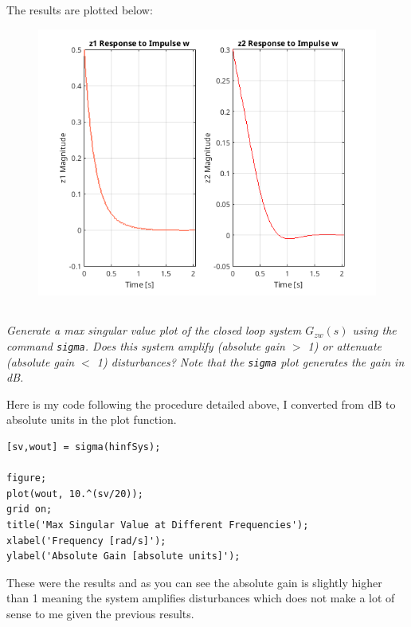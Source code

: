 \documentclass[12pt, letterpaper]{article}
\begin{document}
The results are plotted below:

\begin{figure}[H]
    \centering
    \includegraphics{zResponseHinf.png}
\end{figure}

\subsection{}
\textit{
Generate a max singular value plot of the closed loop system $G_{zw}(s)$ using the command \texttt{sigma}. Does this system amplify (absolute gain $>$ 1) or attenuate (absolute gain $<$ 1) disturbances? Note that the \texttt{sigma} plot generates the gain in dB.
}

Here is my code following the procedure detailed above, I converted from dB to absolute units in the plot function.

\begin{lstlisting}[style=matlabstyle]
[sv,wout] = sigma(hinfSys);

figure;
plot(wout, 10.^(sv/20));
grid on;
title('Max Singular Value at Different Frequencies');
xlabel('Frequency [rad/s]');
ylabel('Absolute Gain [absolute units]');
\end{lstlisting}

These were the results and as you can see the absolute gain is slightly higher than 1 meaning the system amplifies disturbances which does not make a lot of sense to me given the previous results.
\end{document}
